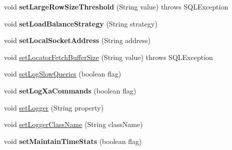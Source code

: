 \begin{DoxyCompactItemize}
\item 
\mbox{\label{classcom_1_1mysql_1_1jdbc_1_1jdbc2_1_1optional_1_1_connection_wrapper_a18f90e008764aa12dd2dcc310142611d}} 
void {\bfseries set\+Large\+Row\+Size\+Threshold} (String value)  throws S\+Q\+L\+Exception 
\item 
\mbox{\label{classcom_1_1mysql_1_1jdbc_1_1jdbc2_1_1optional_1_1_connection_wrapper_aeb9bbf1a1ab80c9ad80c075add016d88}} 
void {\bfseries set\+Load\+Balance\+Strategy} (String strategy)
\item 
\mbox{\label{classcom_1_1mysql_1_1jdbc_1_1jdbc2_1_1optional_1_1_connection_wrapper_aba430f0fc6caf2a0353bfa1f04f2724c}} 
void {\bfseries set\+Local\+Socket\+Address} (String address)
\item 
void \mbox{\hyperlink{classcom_1_1mysql_1_1jdbc_1_1jdbc2_1_1optional_1_1_connection_wrapper_a81b230b8f38e3faa698214cb79cb03b6}{set\+Locator\+Fetch\+Buffer\+Size}} (String value)  throws S\+Q\+L\+Exception 
\item 
void \mbox{\hyperlink{classcom_1_1mysql_1_1jdbc_1_1jdbc2_1_1optional_1_1_connection_wrapper_a392f4a58a5aa8c42317181640bdb6575}{set\+Log\+Slow\+Queries}} (boolean flag)
\item 
\mbox{\label{classcom_1_1mysql_1_1jdbc_1_1jdbc2_1_1optional_1_1_connection_wrapper_ac32291ffa4c29c4c0837fb148bc0d3f6}} 
void {\bfseries set\+Log\+Xa\+Commands} (boolean flag)
\item 
void \mbox{\hyperlink{classcom_1_1mysql_1_1jdbc_1_1jdbc2_1_1optional_1_1_connection_wrapper_ab982b5f1ecb96624a273f3a120971b09}{set\+Logger}} (String property)
\item 
void \mbox{\hyperlink{classcom_1_1mysql_1_1jdbc_1_1jdbc2_1_1optional_1_1_connection_wrapper_a83bbb6fcf7e7526415776d20aff135fd}{set\+Logger\+Class\+Name}} (String class\+Name)
\item 
\mbox{\label{classcom_1_1mysql_1_1jdbc_1_1jdbc2_1_1optional_1_1_connection_wrapper_a5d4c947d71a52b641dbb9e267b047fc3}} 
void {\bfseries set\+Maintain\+Time\+Stats} (boolean flag)

\end{DoxyCompactItemize}
